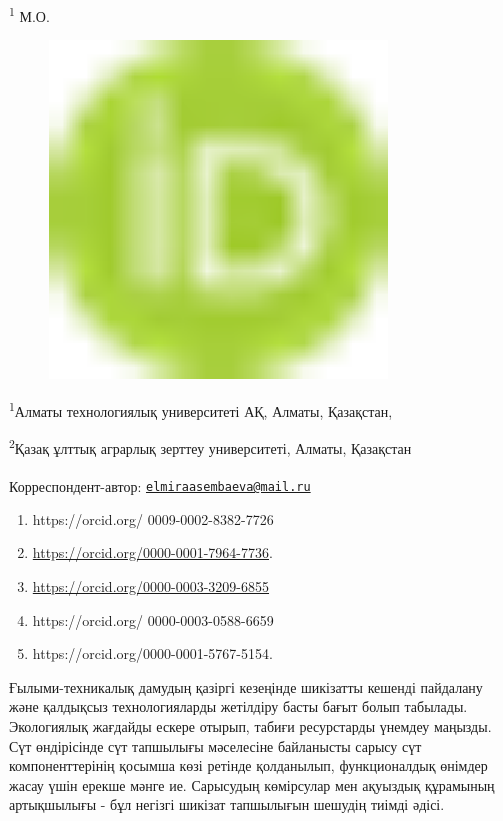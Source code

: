 {{\textsuperscript{1} М.О.
\begin{figure}[H]
	\centering
	\includegraphics[width=0.8\textwidth]{media/pish4/image1}
	\caption*{}
\end{figure}


\textsuperscript{1}Алматы технологиялық университеті АҚ, Алматы,
Қазақстан,

\textsuperscript{2}Қазақ ұлттық аграрлық зерттеу университеті, Алматы,
Қазақстан

{\bfseries \textsuperscript{\envelope }}Корреспондент-автор:
\href{mailto:elmiraasembaeva@mail.ru}{\nolinkurl{elmiraasembaeva@mail.ru}}

\begin{enumerate}
\def\labelenumi{\arabic{enumi}.}
\item
  https://orcid.org/ 0009-0002-8382-7726
\item
  \url{https://orcid.org/0000-0001-7964-7736}.
\item
  \href{https://orcid.org/0000-0001-7258-746X}{https://orcid.org/0000-0003-3209-6855}
\item
  https://orcid.org/ 0000-0003-0588-6659
\item
  https://orcid.org/0000-0001-5767-5154.
\end{enumerate}

Ғылыми-техникалық дамудың қазіргі кезеңінде шикізатты кешенді пайдалану
және қалдықсыз технологияларды жетілдіру басты бағыт болып табылады.
Экологиялық жағдайды ескере отырып, табиғи ресурстарды үнемдеу маңызды.
Сүт өндірісінде сүт тапшылығы мәселесіне байланысты сарысу сүт
компоненттерінің қосымша көзі ретінде қолданылып, функционалдық өнімдер
жасау үшін ерекше мәнге ие. Сарысудың көмірсулар мен ақуыздық құрамының
артықшылығы - бұл негізгі шикізат тапшылығын шешудің тиімді әдісі.

}}
